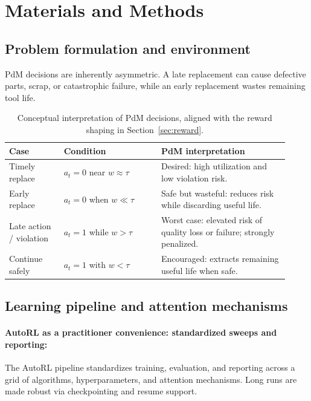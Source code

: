 \documentclass[sn-basic]{sn-jnl} %
\begin{document}
\section{Materials and Methods}
\label{sec:method}
\subsection{Problem formulation and environment}
\label{sec:problem}
\label{sec:env}
\label{sec:reward}
PdM decisions are inherently asymmetric. A late replacement can cause defective parts, scrap, or catastrophic failure, while an early replacement wastes remaining tool life.

\begin{table}[htbp]
	\centering
	\caption{Conceptual interpretation of PdM decisions, aligned with the reward shaping in Section~\ref{sec:reward}.}
	\label{tab:cost_view}
	\begin{tabular}{p{0.18\linewidth} p{0.32\linewidth} p{0.42\linewidth}}
		\toprule
		\textbf{Case} & \textbf{Condition} & \textbf{PdM interpretation}\\
		\midrule
		Timely replace & $a_t=0$ near $w\approx\tau$ & Desired: high utilization and low violation risk.\\
		Early replace & $a_t=0$ when $w\ll\tau$ & Safe but wasteful: reduces risk while discarding useful life.\\
		Late action / violation & $a_t=1$ while $w>\tau$ & Worst case: elevated risk of quality loss or failure; strongly penalized.\\
		Continue safely & $a_t=1$ with $w<\tau$ & Encouraged: extracts remaining useful life when safe.\\
		\bottomrule
	\end{tabular}
\end{table}

\subsection{Learning pipeline and attention mechanisms}\label{sec:algo_desc}
\paragraph{AutoRL as a practitioner convenience: standardized sweeps and reporting:}\label{sec:autorl}
The AutoRL pipeline standardizes training, evaluation, and reporting across a grid of algorithms, hyperparameters, and attention mechanisms. Long runs are made robust via checkpointing and resume support.
\end{document}

